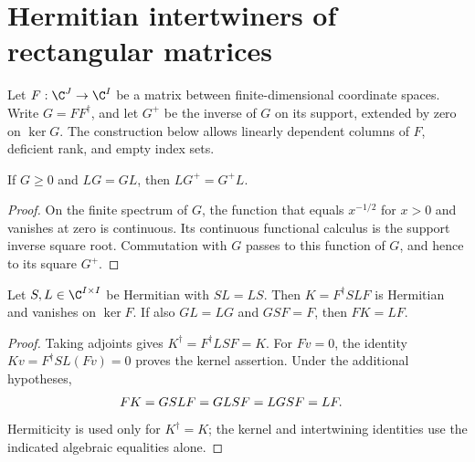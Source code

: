 \section{Hermitian intertwiners of rectangular matrices}
\label{sec:hermitian_rectangular_intertwiners}

Let $F:\C^J\to\C^I$ be a matrix between finite-dimensional coordinate
spaces. Write $G=FF^\dagger$, and let $G^+$ be the inverse of $G$ on its
support, extended by zero on $\ker G$. The construction below allows
linearly dependent columns of $F$, deficient rank, and empty index sets.

\begin{theorem}
    \label{thm:commute_support_inverse}
    \leanok
    If $G\ge0$ and $LG=GL$, then $LG^+=G^+L$.
\end{theorem}
\begin{proof}\leanok
    On the finite spectrum of $G$, the function that equals $x^{-1/2}$
    for $x>0$ and vanishes at zero is continuous. Its continuous functional
    calculus is the support inverse square root. Commutation with $G$
    passes to this function of $G$, and hence to its square $G^+$.
\end{proof}

\begin{theorem}
    \label{thm:supported_rectangular_intertwiner}
    \leanok
    Let $S,L\in\C^{I\times I}$ be Hermitian with $SL=LS$. Then
    $K=F^\dagger SLF$ is Hermitian and vanishes on $\ker F$.
    If also $GL=LG$ and $GSF=F$, then $FK=LF$.
\end{theorem}
\begin{proof}\leanok
    Taking adjoints gives $K^\dagger=F^\dagger LSF=K$.
    For $Fv=0$, the identity $Kv=F^\dagger SL(Fv)=0$ proves the kernel
    assertion. Under the additional hypotheses,
    \begin{align}
        FK&=GSLF=GLSF=LGSF=LF.
        \notag
    \end{align}
    Hermiticity is used only for $K^\dagger=K$; the kernel and
    intertwining identities use the indicated algebraic equalities alone.
\end{proof}

